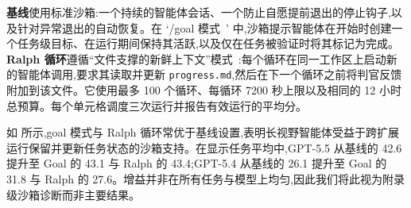\textbf{基线}使用标准沙箱:一个持续的智能体会话、一个防止自愿提前退出的停止钩子,以及针对异常退出的自动恢复。在 `/goal 模式~\cite{openai2026goal}' 中,沙箱提示智能体在开始时创建一个任务级目标、在运行期间保持其活跃,以及仅在任务被验证时将其标记为完成。\textbf{Ralph 循环}遵循``文件支撑的新鲜上下文''模式~\cite{huntley2026ralphloop}:每个循环在同一工作区上启动新的智能体调用,要求其读取并更新 \texttt{progress.md},然后在下一个循环之前将判官反馈附加到该文件。它使用最多 100 个循环、每循环 7200 秒上限以及相同的 12 小时总预算。每个单元格调度三次运行并报告有效运行的平均分。

如  所示,goal 模式与 Ralph 循环常优于基线设置,表明长视野智能体受益于跨扩展运行保留并更新任务状态的沙箱支持。在显示任务平均中,GPT-5.5 从基线的 42.6 提升至 Goal 的 43.1 与 Ralph 的 43.4;GPT-5.4 从基线的 26.1 提升至 Goal 的 31.8 与 Ralph 的 27.6。增益并非在所有任务与模型上均匀,因此我们将此视为附录级沙箱诊断而非主要结果。

